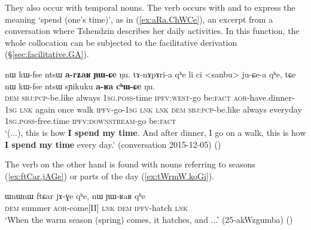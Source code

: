 They also occur with temporal nouns. The verb  occurs with  and  to express the meaning `spend (one's time)', as in (\ref{ex:aRa.ChWCe}), an excerpt from a conversation where Tshendzin describes her daily activities. In this function, the whole collocation can be subjected to the facilitative  derivation (§\ref{sec:facilitative.GA}).  


\begin{exe}
\ex \label{ex:aRa.ChWCe}
\gll nɯ kɯ-fse ntsɯ \textbf{a-rʑaʁ} \textbf{ɲɯ-ɕe} ŋu. tɤ-nɤpɤri-a qʰe li ci <sanbu> ju-ɕe-a qʰe, tɕe nɯ kɯ-fse ntsɯ sɲikuku \textbf{a-ʁa} \textbf{cʰɯ-ɕe} ŋu. \\
\textsc{dem} \textsc{sbj}:\textsc{pcp}-be.like always \textsc{1sg}.\textsc{poss}-time \textsc{ipfv}:\textsc{west}-go be:\textsc{fact} \textsc{aor}-have.dinner-\textsc{1sg} \textsc{lnk} again once walk \textsc{ipfv}-go-\textsc{1sg} \textsc{lnk} \textsc{lnk} \textsc{dem} \textsc{sbj}:\textsc{pcp}-be.like always everyday \textsc{1sg}.\textsc{poss}-free.time \textsc{ipfv}:\textsc{downstream}-go be:\textsc{fact} \\
\glt `(...), this is how \textbf{I spend my time}. And after dinner, I go on a walk, this is how \textbf{I spend my time} every day.' (conversation 2015-12-05)
()
\end{exe}
 
 The verb  on the other hand is found with nouns referring to seasons (\ref{ex:ftCar.jAGe}) or parts of the day (\ref{ex:tWrmW.koGi}).
 
\begin{exe}
\ex \label{ex:ftCar.jAGe}
\gll  ɯnɯnɯ ftɕar jɤ-ɣe qʰe, nɯ ɲɯ-ʁaʁ qʰe \\
\textsc{dem} summer \textsc{aor}-come[II] \textsc{lnk} \textsc{dem} \textsc{ipfv}-hatch \textsc{lnk} \\
\glt `When the warm season (spring) comes, it hatches, and ...' (25-akWzgumba)
()
\end{exe}

